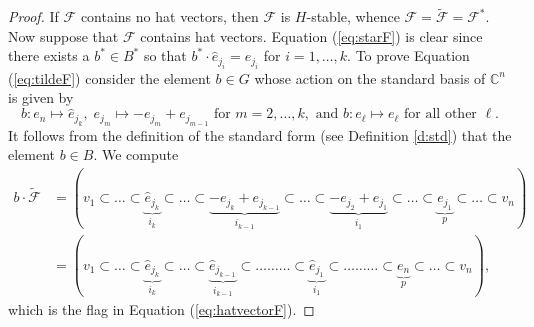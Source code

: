 \documentclass[12pt]{amsart}
\numberwithin{equation}{section}
\newcommand{\C}{\mbox{${\mathbb C}$}}
\newcommand{\he}{\hat{e}}
\newcommand{\F}{\mathcal{F}}
\begin{document}
\begin{proof}
If $\F$ contains no hat vectors, then $\F$ is $H$-stable, whence $\F=\tilde{\F}=\F^{*}$. 
Now suppose that $\F$ contains hat vectors.  Equation (\ref{eq:starF}) is clear since 
there exists a $b^{*}\in B^{*}$ so that $b^{*}\cdot \hat{e}_{j_{i}}=e_{j_{i}}$ for $i=1,\dots,k.$ To prove Equation (\ref{eq:tildeF}) consider the element $b\in G$ whose action on the standard basis of $\C^{n}$ is 
given by 
\begin{equation}\label{eq:tostd}
b: e_{n}\mapsto \he_{j_{k}},\; e_{j_{m}}\mapsto -e_{j_{m}}+e_{j_{m-1}} \mbox{ for } m=2,\dots, k,\mbox{ and } b: e_{\ell}\mapsto e_{\ell} \mbox{ for all other } \ell.
\end{equation}
It follows from the definition of the standard form (see Definition \ref{d:std}) that the element $b\in B$.  
We compute 
\begin{equation*}
\begin{split}
b\cdot \tilde{\F}&=(v_{1}\subset\dots\subset \underbrace{\he_{j_{k}}}_{i_{k}}\subset\dots \subset \underbrace{-e_{j_{k}}+e_{j_{k-1}}}_{i_{k-1}}\subset\dots \subset \underbrace{-e_{j_{2}}+e_{j_{1}}}_{i_{1}}\subset \dots\subset \underbrace{e_{j_{1}}}_{p}\subset\dots \subset v_{n})\\
&=(v_{1}\subset\dots\subset \underbrace{\he_{j_{k}}}_{i_{k}}\subset\dots\subset \underbrace{\he_{j_{k-1}}}_{i_{k-1}}\subset\dots\ldots\ldots\subset\underbrace{\he_{j_{1}}}_{i_{1}}\subset\dots\ldots\ldots\subset \underbrace{e_{n}}_{p}\subset\dots\subset v_{n}),
\end{split}
\end{equation*}
which is the flag in Equation (\ref{eq:hatvectorF}). 
\end{proof}
\end{document}
